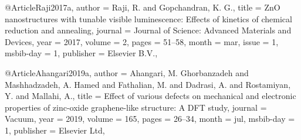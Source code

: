 @Article{Raji2017a,
  author    = {Raji, R. and Gopchandran, K. G.},
  title     = {ZnO nanostructures with tunable visible luminescence: Effects of kinetics of chemical reduction and annealing},
  journal   = {Journal of Science: Advanced Materials and Devices},
  year      = {2017},
  volume    = {2},
  pages     = {51--58},
  month     = mar,
  issue     = {1},
  msbib-day = {1},
  publisher = {Elsevier B.V.},
}

@Article{Ahangari2019a,
  author    = {Ahangari, M. Ghorbanzadeh and Mashhadzadeh, A. Hamed and Fathalian, M. and Dadrasi, A. and Rostamiyan, Y. and Mallahi, A.},
  title     = {Effect of various defects on mechanical and electronic properties of zinc-oxide graphene-like structure: A DFT study},
  journal   = {Vacuum},
  year      = {2019},
  volume    = {165},
  pages     = {26--34},
  month     = jul,
  msbib-day = {1},
  publisher = {Elsevier Ltd},
}
